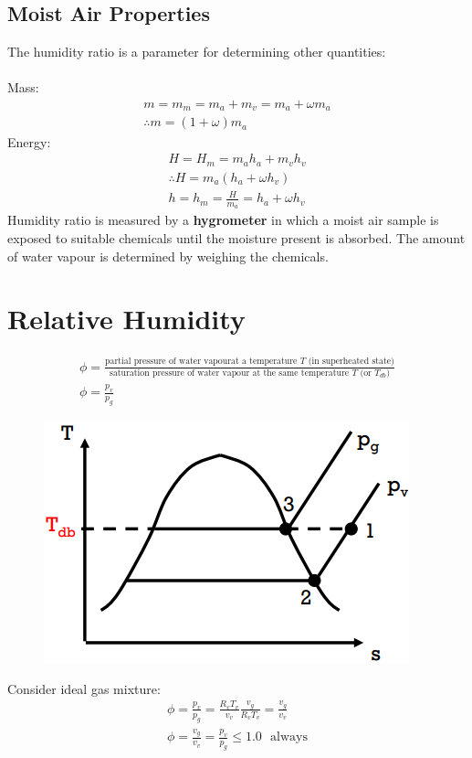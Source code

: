 \documentclass[class=report, crop=false, 12pt,a4paper]{standalone}
\numberwithin{equation}{section}
\begin{document}
\subsection{Moist Air Properties}
The humidity ratio is a parameter for determining other quantities: \\\\
Mass:
\begin{gather}
  m = m_m = m_a + m_v = m_a + \omega m_a \\[5pt]
  \therefore m = (1+\omega)m_a
\end{gather}
Energy:
\begin{gather}
  H = H_m = m_ah_a + m_vh_v \\[5pt]
  \therefore H = m_a(h_a + \omega h_v) \\[5pt]
  h = h_m = \frac{H}{m_a} = h_a + \omega h_v
\end{gather}
Humidity ratio is measured by a \textbf{hygrometer} in which a moist air sample is exposed to suitable chemicals until the moisture present is absorbed. The amount of water vapour is determined by weighing the chemicals.
\section{Relative Humidity}
\begin{gather}
  \phi = \frac{\text{partial pressure of water vapourat a temperature $T$ (in superheated state)}}{\text{saturation pressure of water vapour at the same temperature $T$ (or $T_{db}$)}} \\[5pt]
  \phi = \frac{p_v}{p_g}
\end{gather}
\begin{figure}[H]
  \centering
  \includegraphics[width = 0.45 \textwidth]{../img/diagram99.png}
  \caption{}
\end{figure}
Consider ideal gas mixture:
\begin{gather}
  \phi = \frac{p_v}{p_g} = \frac{R_v T_v}{v_v}\frac{v_g}{R_v T_v} = \frac{v_g}{v_v} \\[5pt]
  \phi = \frac{v_g}{v_v} = \frac{p_v}{p_g} \leq 1.0 \ \ \ \text{always}
\end{gather}
\end{document}
